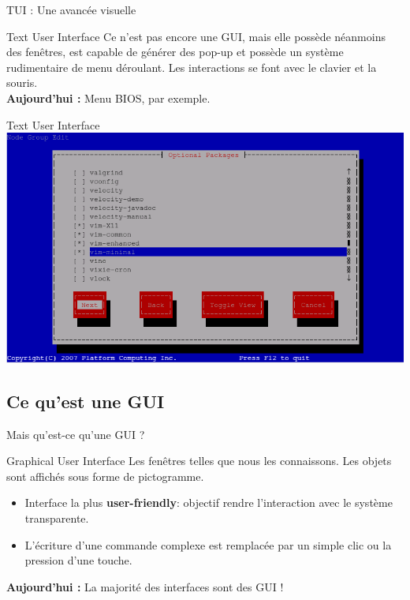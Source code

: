 \documentclass[12pt]{beamer}
\begin{document}
        \begin{frame}{TUI : Une avancée visuelle}
            \begin{block}{Text User Interface }
            Ce n'est pas encore une GUI, mais elle possède néanmoins des fenêtres, est capable de générer des pop-up et possède un système rudimentaire de menu déroulant. Les interactions se font avec le clavier et la souris.\\\textbf{Aujourd'hui :} Menu BIOS, par exemple.
            \end{block}
       \end{frame}
       
\begin{frame}{Text User Interface}
    \includegraphics[width=1\textwidth]{pictures/TUI.png}
    \end{frame}
    \subsection{Ce qu'est une GUI}
    
        \begin{frame}{Mais qu'est-ce qu'une GUI ?}
            \begin{block}{Graphical User Interface}
  Les fenêtres telles que nous les connaissons. Les objets sont affichés sous forme de pictogramme. 
                \begin{itemize}
                    \item Interface la plus \textbf{user-friendly}: objectif rendre l'interaction avec le système transparente.
                    \item L'écriture d'une commande complexe est remplacée par un simple clic ou la pression d'une touche.
                \end{itemize}
                \textbf{Aujourd'hui :} La majorité des interfaces sont des GUI !
            \end{block}
        \end{frame}
        
\end{document}
